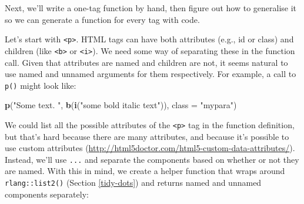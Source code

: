 \documentclass[]{book}
\newenvironment{Shaded}{\begin{snugshade}}{\end{snugshade}}
\newcommand{\CommentTok}[1]{\textcolor[rgb]{0.37,0.37,0.37}{\textit{#1}}}
\newcommand{\ControlFlowTok}[1]{\textcolor[rgb]{0.27,0.27,0.27}{\textbf{#1}}}
\newcommand{\DataTypeTok}[1]{\textcolor[rgb]{0.27,0.27,0.27}{#1}}
\newcommand{\DecValTok}[1]{\textcolor[rgb]{0.06,0.06,0.06}{#1}}
\newcommand{\KeywordTok}[1]{\textcolor[rgb]{0.27,0.27,0.27}{\textbf{#1}}}
\newcommand{\NormalTok}[1]{#1}
\newcommand{\OperatorTok}[1]{\textcolor[rgb]{0.43,0.43,0.43}{\textbf{#1}}}
\newcommand{\StringTok}[1]{\textcolor[rgb]{0.5,0.5,0.5}{#1}}
\renewcommand{\href}[2]{#2 (\url{#1})}
\begin{document}
Next, we'll write a one-tag function by hand, then figure out how to generalise it so we can generate a function for every tag with code.

Let's start with \texttt{\textless{}p\textgreater{}}. HTML tags can have both attributes (e.g., id or class) and children (like \texttt{\textless{}b\textgreater{}} or \texttt{\textless{}i\textgreater{}}). We need some way of separating these in the function call. Given that attributes are named and children are not, it seems natural to use named and unnamed arguments for them respectively. For example, a call to \texttt{p()} might look like:

\begin{Shaded}
\begin{Highlighting}[]
\KeywordTok{p}\NormalTok{(}\StringTok{"Some text. "}\NormalTok{, }\KeywordTok{b}\NormalTok{(}\KeywordTok{i}\NormalTok{(}\StringTok{"some bold italic text"}\NormalTok{)), }\DataTypeTok{class =} \StringTok{"mypara"}\NormalTok{)}
\end{Highlighting}
\end{Shaded}

We could list all the possible attributes of the \texttt{\textless{}p\textgreater{}} tag in the function definition, but that's hard because there are many attributes, and because it's possible to use \href{http://html5doctor.com/html5-custom-data-attributes/}{custom attributes}. Instead, we'll use \texttt{...} and separate the components based on whether or not they are named. With this in mind, we create a helper function that wraps around \texttt{rlang::list2()} (Section \ref{tidy-dots}) and returns named and unnamed components separately:

\begin{Shaded}
\end{Shaded}
\end{document}
